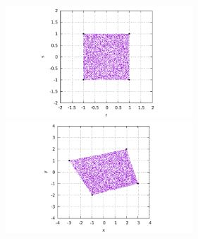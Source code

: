 \begin{center}
\includegraphics[width=7cm]{images/mappings/bilinear/rs.pdf}
\includegraphics[width=7cm]{images/mappings/bilinear/xy.pdf}
\end{center}

